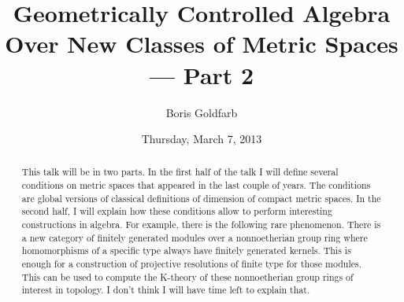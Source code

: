 \documentclass{UAmathtalk}
\author{Boris Goldfarb}
\title{Geometrically Controlled Algebra Over New Classes of Metric Spaces --- Part 2}
\date{Thursday, March 7, 2013}
\begin{document}
\maketitle

\begin{abstract}
This talk will be in two parts.  In the first half of the talk I will define several conditions on metric spaces that appeared in the last couple of years.  The conditions are global versions of classical definitions of dimension of compact metric spaces.  In the second half, I will explain how these conditions allow to perform interesting constructions in algebra.  For example, there is the following rare phenomenon.  There is a new category of finitely generated modules over a nonnoetherian group ring where homomorphisms of a specific type always have finitely generated kernels.  This is enough for a construction of projective resolutions of finite type for those modules.  This can be used to compute the K-theory of these nonnoetherian group rings of interest in topology.  I don't think I will have time left to explain that.
\end{abstract}
\end{document}

